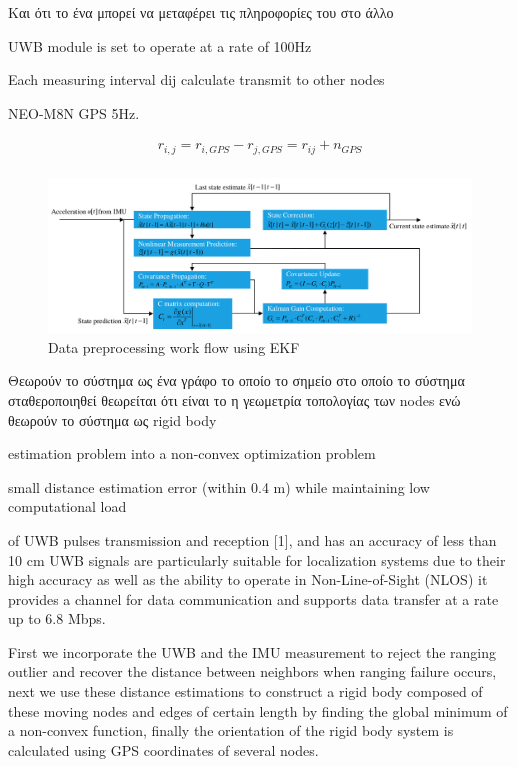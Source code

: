 Και ότι το ένα μπορεί να μεταφέρει τις πληροφορίες του στο άλλο

UWB module is set to operate at a rate of 100Hz

Each measuring interval
	dij calculate
	transmit to other nodes

NEO-M8N GPS 5Hz.

\begin{gather*}
	r_{i,j} = r_{i, GPS} - r_{j, GPS} = r_{ij} + n_{GPS} \\
\end{gather*}


\begin{figure} [H]
	\centering
	\includegraphics[width=\linewidth]{Images/Related-Work/Data-preprocessing-work-flow-using-EKF.png}
	\decoRule
	\caption[Data preprocessing work flow using EKF]{Data preprocessing work flow using EKF\cite{uwb-imu-gps1}}
	\label{fig:Data-preprocessing-work-flow-using-EKF}
\end{figure}

Θεωρούν το σύστημα ως ένα γράφο το οποίο 
το σημείο στο οποίο το σύστημα σταθεροποιηθεί θεωρείται ότι είναι το η γεωμετρία τοπολογίας των nodes
ενώ θεωρούν το σύστημα ως rigid body 

estimation problem into a non-convex optimization problem



small distance estimation error (within 0.4 m) while maintaining low
computational load

% 

of UWB pulses transmission and reception [1], and has an accuracy of less
than 10 cm UWB signals are particularly suitable for localization systems due to their high
accuracy as well as the ability to operate in Non-Line-of-Sight (NLOS)
it provides a channel for data communication and supports data transfer at a rate up to 6.8
Mbps.

First we
incorporate the UWB and the IMU measurement to reject the ranging outlier and recover the
distance between neighbors when ranging failure occurs, next we use these distance estimations
to construct a rigid body composed of these moving nodes and edges of certain length by finding
the global minimum of a non-convex function, finally the orientation of the rigid body system
is calculated using GPS coordinates of several nodes.

